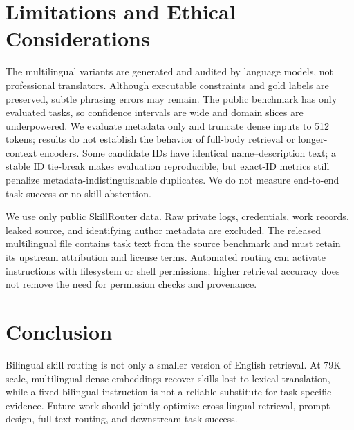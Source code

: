 \documentclass[letterpaper]{article}
\begin{document}
\section{Limitations and Ethical Considerations}

The multilingual variants are generated and audited by language models, not
professional translators.  Although executable constraints and gold labels
are preserved, subtle phrasing errors may remain.  The public benchmark has
only \PublicTaskCount{} evaluated tasks, so confidence intervals are wide and
domain slices are underpowered.  We evaluate metadata only and truncate dense
inputs to 512 tokens; results do not establish the behavior of full-body
retrieval or longer-context encoders.  Some candidate IDs have identical
name--description text; a stable ID tie-break makes evaluation reproducible,
but exact-ID metrics still penalize metadata-indistinguishable duplicates.  We
do not measure end-to-end task success or no-skill abstention.

We use only public SkillRouter data.  Raw private logs, credentials, work
records, leaked source, and identifying author metadata are excluded.  The
released multilingual file contains task text from the source benchmark and
must retain its upstream attribution and license terms.  Automated routing can
activate instructions with filesystem or shell permissions; higher retrieval
accuracy does not remove the need for permission checks and provenance.

\section{Conclusion}

Bilingual skill routing is not only a smaller version of English retrieval.
At 79K scale, multilingual dense embeddings recover skills lost to lexical
translation, while a fixed bilingual instruction is not a reliable substitute
for task-specific evidence.
Future work should jointly optimize cross-lingual retrieval, prompt design,
full-text routing, and downstream task success.

\label{lastcontentpage}

\end{document}
